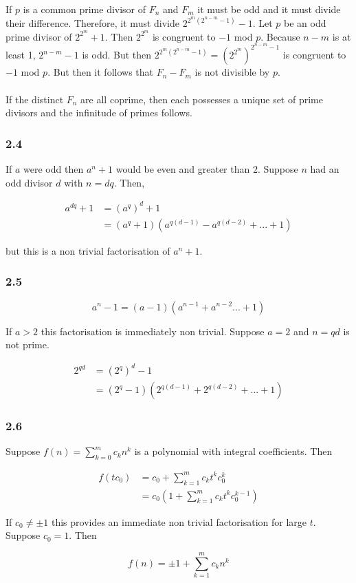 If $p$ is a common prime divisor of $F_n$ and $F_m$ 
it must be odd and it must divide their difference. 
Therefore, it must divide $2^{2^m(2^{n-m} - 1)} - 1$. 
Let $p$ be an odd prime divisor of $2^{2^m} + 1$. Then 
$2^{2^m}$ is congruent to $-1$ mod $p$. Because $n-m$ 
is at least 1, $2^{n-m} - 1$ is odd. But then 
$2^{2^m(2^{n-m} - 1)} = \left(2^{2^m}\right)^{2^{n-m}-1}$ 
is congruent to $-1$ mod $p$. But then it follows that 
$F_n - F_m$ is not divisible by $p$. \\ \\

If the distinct $F_n$ are all coprime, then each possesses 
a unique set of prime divisors and the infinitude of primes 
follows.

\subsubsection{2.4}

If $a$ were odd then $a^n + 1$ would be even and greater than 
2. Suppose $n$ had an odd divisor $d$ with $n = dq$. Then,

\begin{align*}
    a^{dq} + 1 &= \left(a^{q}\right)^d + 1 \\
    &= (a^q + 1)(a^{q(d-1)} - a^{q(d-2)} + ... + 1)
\end{align*}

but this is a non trivial factorisation of $a^n + 1$.

\subsubsection{2.5}

\begin{equation*}
    a^n - 1 = (a-1)(a^{n-1} + a^{n-2} ... + 1)
\end{equation*}

If $a > 2$ this factorisation is immediately non trivial. 
Suppose $a=2$ and $n = qd$ is not prime.

\begin{align*}
    2^{qd} &= \left(2^q\right)^d - 1 \\
    &= (2^{q} - 1)(2^{q(d-1)} + 2^{q(d-2)} + ... + 1)
\end{align*}

\subsubsection{2.6}

Suppose $f(n) = \sum_{k=0}^m c_k n^k $ is a polynomial with 
integral coefficients. Then

\begin{align*}
    f(tc_0) &= c_0 + \sum_{k=1}^m c_k t^k c_0^k \\
    &= c_0(1 + \sum_{k=1}^m c_k t^k c_0^{k-1})
\end{align*}

If $c_0\neq \pm 1$ this provides an immediate non trivial 
factorisation for large $t$. Suppose $c_0 = 1$. Then 

\begin{equation*}
    f(n) = \pm 1 + \sum_{k=1}^m c_k n^k
\end{equation*}